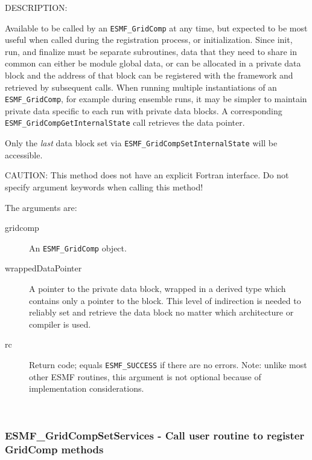 {\sf DESCRIPTION:\\ }


   Available to be called by an {\tt ESMF\_GridComp} at any time, but
   expected to be
   most useful when called during the registration process, or initialization.
   Since init, run, and finalize must be separate subroutines, data that
   they need to share in common can either be module global data, or can
   be allocated in a private data block and the address of that block
   can be registered with the framework and retrieved by subsequent calls.
   When running multiple instantiations of an {\tt ESMF\_GridComp},
   for example during
   ensemble runs, it may be simpler to maintain private data specific to
   each run with private data blocks.  A corresponding
   {\tt ESMF\_GridCompGetInternalState} call retrieves the data pointer.
  
   Only the {\em last} data block set via
   {\tt ESMF\_GridCompSetInternalState} will be accessible.
  
   CAUTION: This method does not have an explicit Fortran interface. Do not
   specify argument keywords when calling this method!
  
   The arguments are:
   \begin{description}
   \item[gridcomp]
     An {\tt ESMF\_GridComp} object.
   \item[wrappedDataPointer]
     A pointer to the private data block, wrapped in a derived type which
     contains only a pointer to the block.  This level of indirection is
     needed to reliably set and retrieve the data block no matter which
     architecture or compiler is used.
   \item[rc]
     Return code; equals {\tt ESMF\_SUCCESS} if there are no errors.
     Note: unlike most other ESMF routines, this argument is not optional
     because of implementation considerations.
   \end{description}
   
 
\mbox{}\hrulefill\ 
 
\subsubsection [ESMF\_GridCompSetServices] {ESMF\_GridCompSetServices - Call user routine to register GridComp methods}


